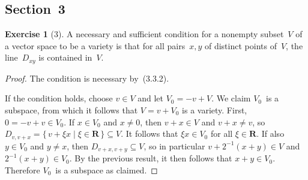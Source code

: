 \documentclass[letterpaper,12pt]{article}
\newcommand{\R}{\mathbf{R}}
\theoremstyle{definition}
\newtheorem*{exer}{Exercise}
\theoremstyle{remark}
\begin{document}
\subsection*{Section~3}
\begin{exer}[3]
A necessary and sufficient condition for a nonempty subset~\(V\) of a vector space to be a variety is that for all pairs~\(x,y\) of distinct points of~\(V\), the line~\(D_{xy}\) is contained in~\(V\).
\end{exer}
\begin{proof}
The condition is necessary by~(3.3.2).

If the condition holds, choose \(v\in V\) and let \(V_0=-v+V\). We claim \(V_0\)~is a subspace, from which it follows that \(V=v+V_0\) is a variety. First, \(0=-v+v\in V_0\). If \(x\in V_0\) and \(x\ne 0\), then \(v+x\in V\) and \(v+x\ne v\), so \(D_{v,v+x}=\{\,v+\xi x\mid\xi\in\R\,\}\subseteq V\). It follows that \(\xi x\in V_0\) for all \(\xi\in\R\). If also \(y\in V_0\) and \(y\ne x\), then \(D_{v+x,v+y}\subseteq V\), so in particular \(v+2^{-1}(x+y)\in V\) and \(2^{-1}(x+y)\in V_0\). By the previous result, it then follows that \(x+y\in V_0\). Therefore \(V_0\)~is a subspace as claimed.
\end{proof}
\end{document}
